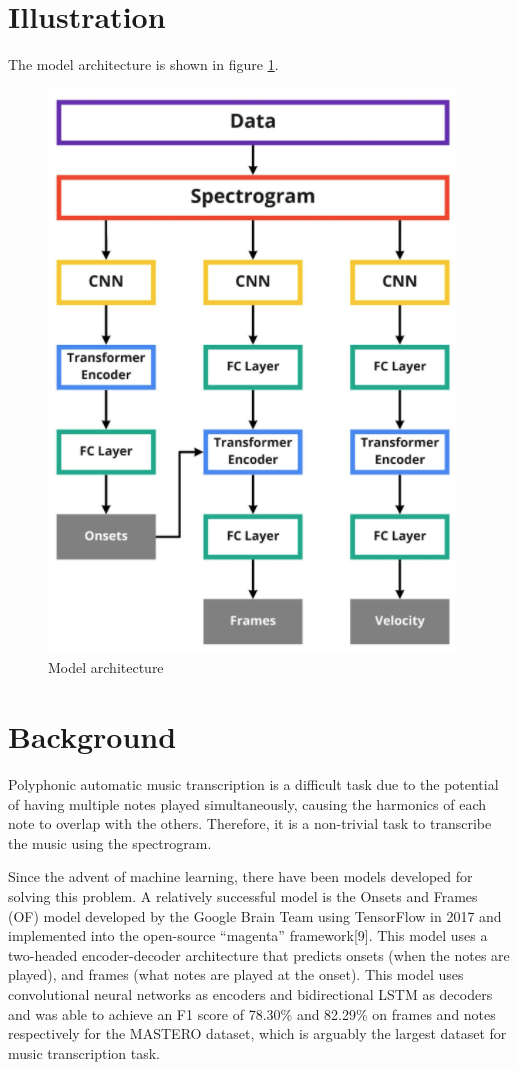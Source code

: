\documentclass[a4paper,twocolumn,10pt]{article}
\begin{document}
\section{Illustration}
The model architecture is shown in figure \ref{fig:architecture}.
\begin{figure}[h!]
  \centering
  \includegraphics[width=0.7\linewidth]{figures/architecture.png}
  \caption{Model architecture}
  \label{fig:architecture}
\end{figure}

\section{Background}
Polyphonic automatic music transcription is a difficult task due to the potential of having multiple notes played simultaneously, causing the harmonics of each note to overlap with the others. Therefore, it is a non-trivial task to transcribe the music using the spectrogram. 

Since the advent of machine learning, there have been models developed for solving this problem. A relatively successful model is the Onsets and Frames (OF) model developed by the Google Brain Team using TensorFlow in 2017 and implemented into the open-source “magenta” framework[9]. This model uses a two-headed encoder-decoder architecture that predicts onsets (when the notes are played), and frames (what notes are played at the onset). This model uses convolutional neural networks as encoders and bidirectional LSTM as decoders and was able to achieve an F1 score of 78.30\% and 82.29\% on frames and notes respectively for the MASTERO dataset, which is arguably the largest dataset for music transcription task.
\end{document}
